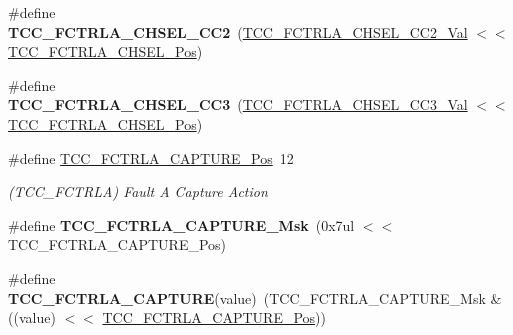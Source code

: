 \begin{DoxyCompactItemize}
\item 
\hypertarget{group___s_a_m_l21___t_c_c_ga484e13709d203237a58aa676f85c2b3f}{}\#define {\bfseries T\+C\+C\+\_\+\+F\+C\+T\+R\+L\+A\+\_\+\+C\+H\+S\+E\+L\+\_\+\+C\+C2}~(\hyperlink{group___s_a_m_l21___t_c_c_ga73a57b0de776d728a859c053b5fb2aae}{T\+C\+C\+\_\+\+F\+C\+T\+R\+L\+A\+\_\+\+C\+H\+S\+E\+L\+\_\+\+C\+C2\+\_\+\+Val}      $<$$<$ \hyperlink{group___s_a_m_l21___t_c_c_gaf5d2e7e2fb26fa98fd5d1b9c2bd67caa}{T\+C\+C\+\_\+\+F\+C\+T\+R\+L\+A\+\_\+\+C\+H\+S\+E\+L\+\_\+\+Pos})\label{group___s_a_m_l21___t_c_c_ga484e13709d203237a58aa676f85c2b3f}

\item 
\hypertarget{group___s_a_m_l21___t_c_c_ga975dd058d584f3ef60c9c5fbca1297f5}{}\#define {\bfseries T\+C\+C\+\_\+\+F\+C\+T\+R\+L\+A\+\_\+\+C\+H\+S\+E\+L\+\_\+\+C\+C3}~(\hyperlink{group___s_a_m_l21___t_c_c_ga53a6b7146d7216138207ce18c47eaf81}{T\+C\+C\+\_\+\+F\+C\+T\+R\+L\+A\+\_\+\+C\+H\+S\+E\+L\+\_\+\+C\+C3\+\_\+\+Val}      $<$$<$ \hyperlink{group___s_a_m_l21___t_c_c_gaf5d2e7e2fb26fa98fd5d1b9c2bd67caa}{T\+C\+C\+\_\+\+F\+C\+T\+R\+L\+A\+\_\+\+C\+H\+S\+E\+L\+\_\+\+Pos})\label{group___s_a_m_l21___t_c_c_ga975dd058d584f3ef60c9c5fbca1297f5}

\item 
\hypertarget{group___s_a_m_l21___t_c_c_ga130a647ff472e004168fd7ec22f13b9d}{}\#define \hyperlink{group___s_a_m_l21___t_c_c_ga130a647ff472e004168fd7ec22f13b9d}{T\+C\+C\+\_\+\+F\+C\+T\+R\+L\+A\+\_\+\+C\+A\+P\+T\+U\+R\+E\+\_\+\+Pos}~12\label{group___s_a_m_l21___t_c_c_ga130a647ff472e004168fd7ec22f13b9d}

\begin{DoxyCompactList}\small\item\em (T\+C\+C\+\_\+\+F\+C\+T\+R\+L\+A) Fault A Capture Action \end{DoxyCompactList}\item 
\hypertarget{group___s_a_m_l21___t_c_c_gac0bf021f11792fe8ed5e8cedd5541aa4}{}\#define {\bfseries T\+C\+C\+\_\+\+F\+C\+T\+R\+L\+A\+\_\+\+C\+A\+P\+T\+U\+R\+E\+\_\+\+Msk}~(0x7ul $<$$<$ T\+C\+C\+\_\+\+F\+C\+T\+R\+L\+A\+\_\+\+C\+A\+P\+T\+U\+R\+E\+\_\+\+Pos)\label{group___s_a_m_l21___t_c_c_gac0bf021f11792fe8ed5e8cedd5541aa4}

\item 
\hypertarget{group___s_a_m_l21___t_c_c_ga8936a3ac0f30dad5f64bc828055327dd}{}\#define {\bfseries T\+C\+C\+\_\+\+F\+C\+T\+R\+L\+A\+\_\+\+C\+A\+P\+T\+U\+R\+E}(value)~(T\+C\+C\+\_\+\+F\+C\+T\+R\+L\+A\+\_\+\+C\+A\+P\+T\+U\+R\+E\+\_\+\+Msk \& ((value) $<$$<$ \hyperlink{group___s_a_m_l21___t_c_c_ga130a647ff472e004168fd7ec22f13b9d}{T\+C\+C\+\_\+\+F\+C\+T\+R\+L\+A\+\_\+\+C\+A\+P\+T\+U\+R\+E\+\_\+\+Pos}))\label{group___s_a_m_l21___t_c_c_ga8936a3ac0f30dad5f64bc828055327dd}


\end{DoxyCompactItemize}

